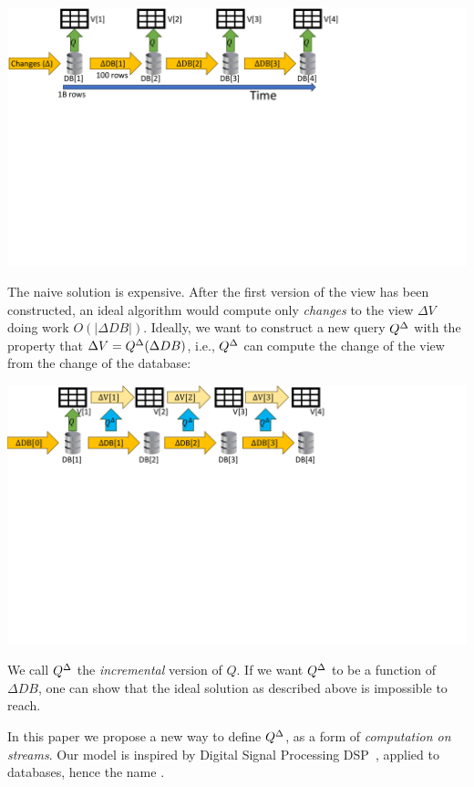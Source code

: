 \noindent \includegraphics[trim={0 4.8in 3.7in 0},clip,scale=.34]{view.pdf}

The naive solution is expensive.  After the first version of the view
has been constructed, an ideal algorithm would compute only
\emph{changes} to the view $\Delta V$ doing work $O(|\Delta DB|)$.
Ideally, we want to construct a new query ${Q}^{\Delta}$ with the property
that $\Delta V = {Q}^{\Delta}(\Delta DB)$, i.e., ${Q}^{\Delta}$ can compute the
change of the view from the change of the database:

\noindent \includegraphics[trim={0 5.2in 4.1in 0},clip,scale=.35]{incview.pdf}

We call ${Q}^{\Delta}$ the \emph{incremental} version of $Q$.  If we want
${Q}^{\Delta}$ to be a function of $\Delta DB$, one can show that the ideal
solution as described above is impossible to reach.

In this paper we propose a new way to define ${Q}^{\Delta}$, as a form of
\emph{computation on streams}.  Our model is inspired by Digital
Signal Processing DSP~\cite{rabiner-book75}, applied to databases,
hence the name \dbsp.

